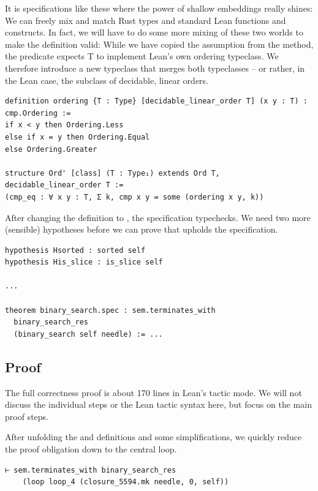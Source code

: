 It is specifications like these where the power of shallow embeddings really
shines: We can freely mix and match Rust types and standard Lean functions and
constructs. In fact, we will have to do some more mixing of these two worlds to make
the definition valid: While we have copied the assumption  from
the  method, the  predicate expects T to
implement Lean's own ordering typeclass. We therefore introduce a new typeclass
 that merges both typeclasses -- or rather, in the Lean case, the
subclass of decidable, linear orders.

\begin{verbatim}
definition ordering {T : Type} [decidable_linear_order T] (x y : T) : cmp.Ordering :=
if x < y then Ordering.Less
else if x = y then Ordering.Equal
else Ordering.Greater

structure Ord' [class] (T : Type₁) extends Ord T, decidable_linear_order T :=
(cmp_eq : ∀ x y : T, Σ k, cmp x y = some (ordering x y, k))
\end{verbatim}

After changing the  definition to , the
specification typechecks. We need two more (sensible) hypotheses before we can
prove that  upholds the specification.

\begin{verbatim}
hypothesis Hsorted : sorted self
hypothesis His_slice : is_slice self

...

theorem binary_search.spec : sem.terminates_with
  binary_search_res
  (binary_search self needle) := ...
\end{verbatim}

\subsection{Proof}

The full correctness proof is about 170 lines in Lean's tactic mode. We will not
discuss the individual steps or the Lean tactic syntax here, but focus on the main
proof steps.

After unfolding the  and 
definitions and some simplifications, we quickly reduce the proof obligation
down to the central loop.

\begin{verbatim}
⊢ sem.terminates_with binary_search_res
    (loop loop_4 (closure_5594.mk needle, 0, self))
\end{verbatim}

